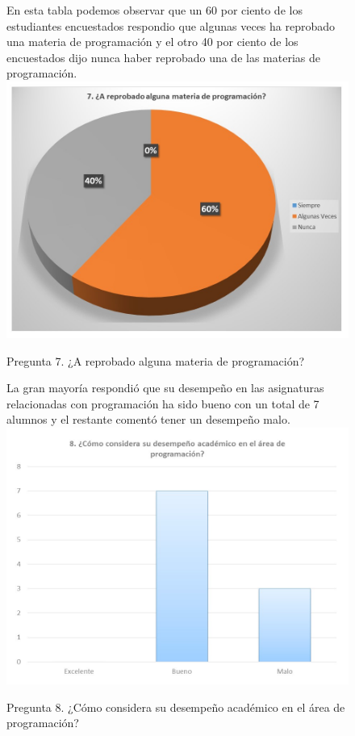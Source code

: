 \documentclass[12pt] {report}
\begin{document}
\begin{figure}[H]
\centering
En esta tabla podemos observar que un 60 por ciento de los estudiantes encuestados respondio que algunas veces ha reprobado una materia de programación y el otro 40 por ciento de los encuestados dijo nunca haber reprobado una de las materias de programación.   
\includegraphics[scale=.7]{pregunta7.JPG}
\caption{Pregunta 7. ¿A reprobado alguna materia de programación?}
\end{figure}
\begin{figure}[H]
\centering
La gran mayoría respondió que su desempeño en las asignaturas relacionadas con programación ha sido bueno con un total de 7 alumnos y el restante comentó tener un desempeño malo.  
\includegraphics[scale=.7]{pregunta8.JPG}
\caption{Pregunta 8. ¿Cómo considera su desempeño académico en el área de programación?}
\end{figure}
\end{document}
